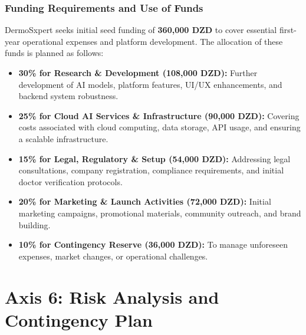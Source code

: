\subsection{Funding Requirements and Use of Funds}
DermoSxpert seeks initial seed funding of \textbf{360,000 DZD} to cover essential first-year operational expenses and platform development. The allocation of these funds is planned as follows:
\begin{itemize}
  \item \textbf{30\% for Research \& Development (108,000 DZD):} Further development of AI models, platform features, UI/UX enhancements, and backend system robustness.
  \item \textbf{25\% for Cloud AI Services \& Infrastructure (90,000 DZD):} Covering costs associated with cloud computing, data storage, API usage, and ensuring a scalable infrastructure.
  \item \textbf{15\% for Legal, Regulatory \& Setup (54,000 DZD):} Addressing legal consultations, company registration, compliance requirements, and initial doctor verification protocols.
  \item \textbf{20\% for Marketing \& Launch Activities (72,000 DZD):} Initial marketing campaigns, promotional materials, community outreach, and brand building.
  \item \textbf{10\% for Contingency Reserve (36,000 DZD):} To manage unforeseen expenses, market changes, or operational challenges.
\end{itemize}

\chapter{Axis 6: Risk Analysis and Contingency Plan}

